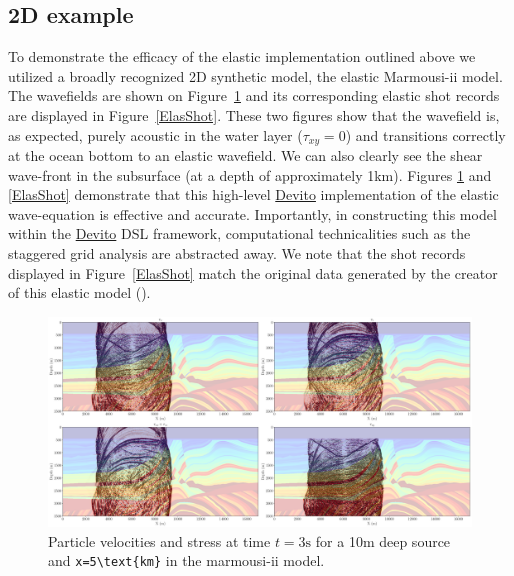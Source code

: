 \documentclass[10pt, conference]{IEEEtran}
\newcommand{\devito}{\href{https://github.com/devitocodes/devito}{Devito} }
\begin{document}
\subsection{2D example}\label{d-example}

To demonstrate the efficacy of the elastic implementation outlined
above we utilized a broadly recognized 2D synthetic model, the elastic
Marmousi-ii\cite{versteeg927, marmouelas} model. The wavefields are
shown on Figure~\ref{ElasWf} and its corresponding elastic shot records
are displayed in Figure~\ref{ElasShot}. These two figures show that the
wavefield is, as expected, purely acoustic in the water layer
($\tau_{xy}=0$) and transitions correctly at the ocean bottom to
an elastic wavefield. We can also clearly see the shear wave-front
in the subsurface (at a depth of approximately 1km). Figures \ref{ElasWf}
and \ref{ElasShot} demonstrate that this high-level \devito implementation
of the elastic wave-equation is effective and accurate.  Importantly, in
constructing this model within the \devito DSL framework, computational
technicalities such as the staggered grid analysis are abstracted away. We
note that the shot records displayed in Figure~\ref{ElasShot} match the
original data generated by the creator of this elastic model
(\cite{marmouelas}).

\begin{figure}
\centering
\includegraphics[width=1.000\hsize]{./Figures/marmou_snap.png}
\caption{Particle velocities and stress at time $t=3\text{s}$ for a
10m deep source and \texttt{x=5\textbackslash{}text\{km\}} in the
marmousi-ii model.}\label{ElasWf}
\end{figure}
\end{document}
